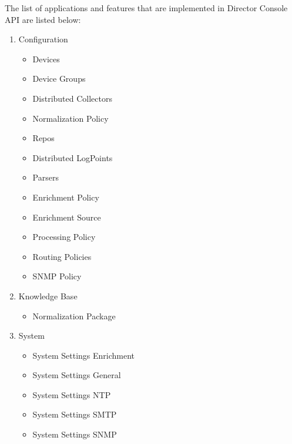 \documentclass[letterpaper,10pt,oneside,english]{sphinxmanual}
\begin{document}
The list of applications and features that are implemented in Director Console API are listed below:
\begin{enumerate}
\item {} 
Configuration
\begin{itemize}
\item {} 
Devices

\item {} 
Device Groups

\item {} 
Distributed Collectors

\item {} 
Normalization Policy

\item {} 
Repos

\item {} 
Distributed LogPoints

\item {} 
Parsers

\item {} 
Enrichment Policy

\item {} 
Enrichment Source

\item {} 
Processing Policy

\item {} 
Routing Policies

\item {} 
SNMP Policy

\end{itemize}

\item {} 
Knowledge Base
\begin{itemize}
\item {} 
Normalization Package

\end{itemize}

\item {} 
System
\begin{itemize}
\item {} 
System Settings Enrichment

\item {} 
System Settings General

\item {} 
System Settings NTP

\item {} 
System Settings SMTP

\item {} 
System Settings SNMP


\end{itemize}
\end{enumerate}
\end{document}
